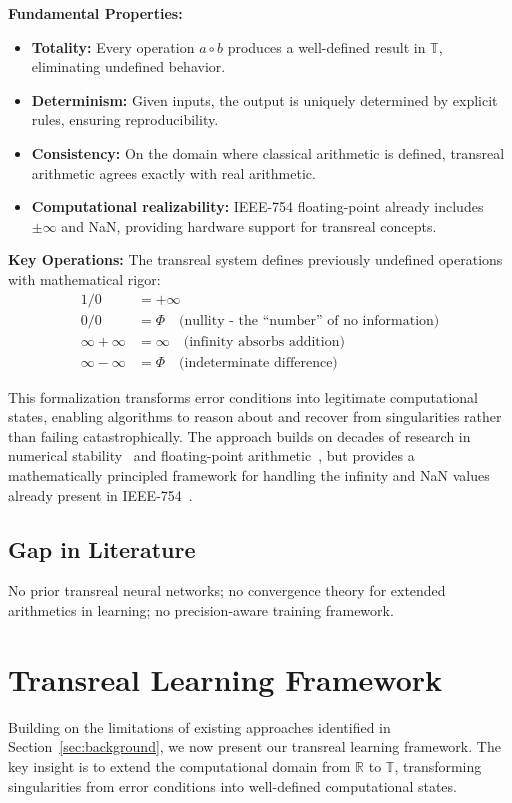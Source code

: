 \documentclass[twoside,11pt]{article}
\begin{document}
\textbf{Fundamental Properties:}
\begin{itemize}
\item \textbf{Totality:} Every operation $a \circ b$ produces a well-defined result in $\mathbb{T}$, eliminating undefined behavior.
\item \textbf{Determinism:} Given inputs, the output is uniquely determined by explicit rules, ensuring reproducibility.
\item \textbf{Consistency:} On the domain where classical arithmetic is defined, transreal arithmetic agrees exactly with real arithmetic.
\item \textbf{Computational realizability:} IEEE-754 floating-point already includes $\pm\infty$ and NaN, providing hardware support for transreal concepts.
\end{itemize}

\textbf{Key Operations:}
The transreal system defines previously undefined operations with mathematical rigor:
\begin{align}
1/0 &= +\infty \\
0/0 &= \Phi \quad \text{(nullity - the ``number'' of no information)} \\
\infty + \infty &= \infty \quad \text{(infinity absorbs addition)} \\
\infty - \infty &= \Phi \quad \text{(indeterminate difference)}
\end{align}

This formalization transforms error conditions into legitimate computational states, enabling algorithms to reason about and recover from singularities rather than failing catastrophically. The approach builds on decades of research in numerical stability~\citep{higham2002accuracy} and floating-point arithmetic~\citep{goldberg1991every,ieee754-2019}, but provides a mathematically principled framework for handling the infinity and NaN values already present in IEEE-754~\citep{kahan1996ieee}.
\subsection{Gap in Literature}
No prior transreal neural networks; no convergence theory for extended arithmetics in learning; no precision-aware training framework.

\section{Transreal Learning Framework}
\label{sec:framework}
Building on the limitations of existing approaches identified in Section~\ref{sec:background}, we now present our transreal learning framework. The key insight is to extend the computational domain from $\mathbb{R}$ to $\mathbb{T}$, transforming singularities from error conditions into well-defined computational states.
\end{document}
